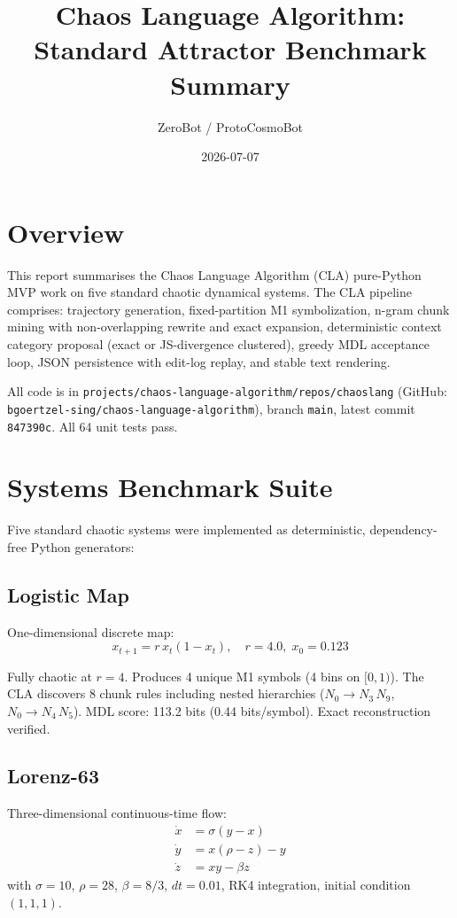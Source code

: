 \documentclass[11pt]{article}
\title{Chaos Language Algorithm: Standard Attractor Benchmark Summary}
\author{ZeroBot / ProtoCosmoBot}
\date{2026-07-07}
\begin{document}
\maketitle

\section{Overview}

This report summarises the Chaos Language Algorithm (CLA) pure-Python MVP
work on five standard chaotic dynamical systems. The CLA pipeline
comprises: trajectory generation, fixed-partition M1 symbolization,
n-gram chunk mining with non-overlapping rewrite and exact expansion,
deterministic context category proposal (exact or JS-divergence clustered),
greedy MDL acceptance loop, JSON persistence with edit-log replay, and
stable text rendering.

All code is in \texttt{projects/chaos-language-algorithm/repos/chaoslang}
(GitHub: \texttt{bgoertzel-sing/chaos-language-algorithm}), branch
\texttt{main}, latest commit \texttt{847390c}. All 64 unit tests pass.

\section{Systems Benchmark Suite}

Five standard chaotic systems were implemented as deterministic,
dependency-free Python generators:

\subsection{Logistic Map}

One-dimensional discrete map:
\begin{equation}
x_{t+1} = r \, x_t (1 - x_t), \quad r = 4.0, \; x_0 = 0.123
\end{equation}

Fully chaotic at $r=4$. Produces 4 unique M1 symbols (4 bins on $[0,1)$).
The CLA discovers 8 chunk rules including nested hierarchies
($N_0 \to N_3 \, N_9$, $N_0 \to N_4 \, N_5$). MDL score: 113.2 bits
(0.44 bits/symbol). Exact reconstruction verified.

\subsection{Lorenz-63}

Three-dimensional continuous-time flow:
\begin{align}
\dot{x} &= \sigma(y - x) \\
\dot{y} &= x(\rho - z) - y \\
\dot{z} &= xy - \beta z
\end{align}
with $\sigma = 10$, $\rho = 28$, $\beta = 8/3$, $dt = 0.01$, RK4 integration,
initial condition $(1, 1, 1)$.
\end{document}

